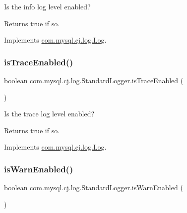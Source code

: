 Is the \textquotesingle{}info\textquotesingle{} log level enabled?

\begin{DoxyReturn}{Returns}
true if so. 
\end{DoxyReturn}


Implements \mbox{\hyperlink{interfacecom_1_1mysql_1_1cj_1_1log_1_1_log_aecb7f781b61b516d6bad9ada8e7dd3aa}{com.\+mysql.\+cj.\+log.\+Log}}.

\mbox{\label{classcom_1_1mysql_1_1cj_1_1log_1_1_standard_logger_afb271f7134e427754d35ae250b222f9e}} 
\subsubsection{\texorpdfstring{is\+Trace\+Enabled()}{isTraceEnabled()}}
{\footnotesize\ttfamily boolean com.\+mysql.\+cj.\+log.\+Standard\+Logger.\+is\+Trace\+Enabled (\begin{DoxyParamCaption}{ }\end{DoxyParamCaption})}

Is the \textquotesingle{}trace\textquotesingle{} log level enabled?

\begin{DoxyReturn}{Returns}
true if so. 
\end{DoxyReturn}


Implements \mbox{\hyperlink{interfacecom_1_1mysql_1_1cj_1_1log_1_1_log_a814070e176d987da656b45662bc63ccd}{com.\+mysql.\+cj.\+log.\+Log}}.

\mbox{\label{classcom_1_1mysql_1_1cj_1_1log_1_1_standard_logger_aad87d184634e72518bbc1a162fb06200}} 
\subsubsection{\texorpdfstring{is\+Warn\+Enabled()}{isWarnEnabled()}}
{\footnotesize\ttfamily boolean com.\+mysql.\+cj.\+log.\+Standard\+Logger.\+is\+Warn\+Enabled (\begin{DoxyParamCaption}{ }\end{DoxyParamCaption})}

